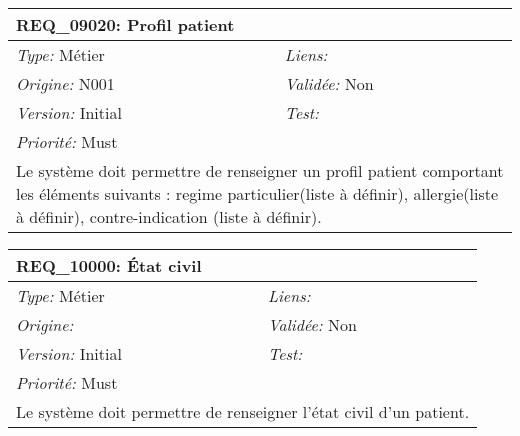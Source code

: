 \begin{table}[!h]

\begin{tabular}{|p{60mm}p{100mm}|}

\hline

\multicolumn{2}{|l|}{\textbf{REQ\_09020:} Profil patient} \\ \hline

\emph{Type:} Métier & \emph{Liens:}  \\

\emph{Origine:} N001 & \emph{Validée:} Non \\

\emph{Version:} Initial & \emph{Test:}  \\

\emph{Priorité:} Must & \\ \hline

\multicolumn{2}{|p{16cm}|}{Le système doit permettre de renseigner un profil patient comportant les éléments suivants : regime particulier(liste à définir), allergie(liste à définir), contre-indication (liste à définir).} \\ \hline

\end{tabular}

\end{table}



\begin{table}[!h]

\begin{tabular}{|p{60mm}p{100mm}|}

\hline

\multicolumn{2}{|l|}{\textbf{REQ\_10000:} État civil} \\ \hline

\emph{Type:} Métier & \emph{Liens:}  \\

\emph{Origine:}  & \emph{Validée:} Non \\

\emph{Version:} Initial & \emph{Test:}  \\

\emph{Priorité:} Must & \\ \hline

\multicolumn{2}{|p{16cm}|}{Le système doit permettre de renseigner l'état civil d'un patient.} \\ \hline

\end{tabular}

\end{table}



